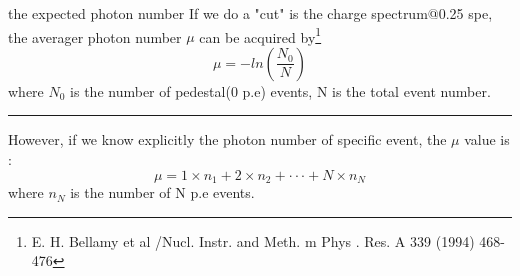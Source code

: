 \documentclass[11pt,compress,xcolor=x11names,UTF8]{beamer}
\begin{document}
\begin{frame}{ the expected photon number}
	If we do a "cut" is the charge spectrum@0.25 spe, the averager photon number $\mu$ can be acquired by\footnote{E. H. Bellamy et al /Nucl. Instr. and Meth. m Phys . Res. A 339 (1994) 468-476}
\begin{equation}
	\mu=-ln(\frac{N_{0}}{N})
\end{equation}
	where $N_{0}$ is the number of pedestal(0 p.e) events, N is the total event number.
\vspace{.3cm}
\hrule{\textwidth}
\vspace{.3cm}
However, if we know explicitly the photon number of specific event, the $\mu$ value is :
\begin{equation}
	\mu=1\times n_{1}+2\times n_{2}+\cdot\cdot\cdot+N\times n_{N}
\end{equation}
	where $n_{N}$ is the number of N p.e events.
\end{frame}
%
%
\end{document}
